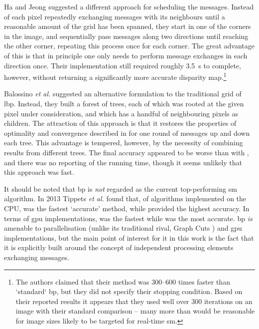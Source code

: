 Ha and Jeong \cite{Ha2016} suggested a different approach for scheduling the messages.  Instead of each pixel repeatedly exchanging messages with its neighbours until a reasonable amount of the grid has been spanned, they start in one of the corners in the image, and sequentially pass messages along two directions until reaching the other corner, repeating this process once for each corner.  The great advantage of this is that in principle one only needs to perform message exchanges in each direction once.  Their implementation still required roughly \SI{3.5}{\second} to complete, however, without returning a significantly more accurate disparity map.\footnote{The authors claimed that their method was \numrange{300}{600} times faster than `standard` \gls{bp}, but they did not specify their stopping condition.  Based on their reported results it appears that they used well over 300 iterations on an image with their standard comparison -- many more than would be reasonable for image sizes likely to be targeted for real-time \gls{sm}.}

Balossino \textit{et al.} \cite{Balossino2007} suggested an alternative formulation to the traditional grid of \gls{lbp}.  Instead, they built a forest of trees, each of which was rooted at the given pixel under consideration, and which has a handful of neighbouring pixels as children.  The attraction of this approach is that it restores the properties of optimality and convergence described in \cite{Pearl1982} for one round of messages up and down each tree.  This advantage is tempered, however, by the necessity of combining results from different trees.  The final accuracy appeared to be worse than with \cite{Felzenszwalb2006}, and there was no reporting of the running time, though it seems unlikely that this approach was fast.

It should be noted that \gls{bp} is \emph{not} regarded as the current top-performing \gls{sm} algorithm.  In 2013 Tippets \textit{et al.} found that, of algorithms implemented on the CPU,  was the fastest `accurate' method, while  provided the highest accuracy.  In terms of \gls{gpu} implementations,  was the fastest while  was the most accurate.  \gls{bp} \emph{is} amenable to parallelisation (unlike its traditional rival, Graph Cuts \cite{Tappen2003}) and \gls{gpu} implementations, but the main point of interest for it in this work is the fact that it is explicitly built around the concept of independent processing elements exchanging messages.

